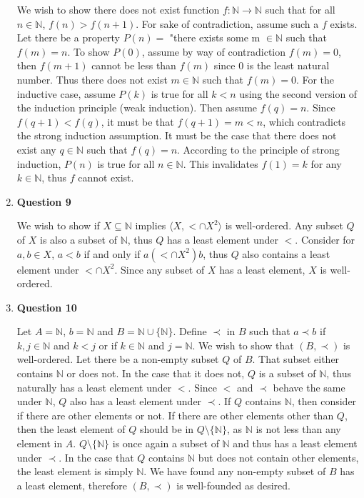 \documentclass{article}
\begin{document}
\begin{enumerate}
	 We wish to show there does not exist function $f: \mathbb{N} \xrightarrow{} \mathbb{N}$ such that for all $n \in \mathbb{N}$, $f(n) > f(n + 1)$. For sake of contradiction, assume such a $f$ exists. Let there be a property $P(n) = $ "there exists some m $\in \mathbb{N}$ such that $f(m) = n$. To show $P(0)$, assume by way of contradiction $f(m) = 0$, then $f(m + 1)$ cannot be less than $f(m)$ since $0$ is the least natural number. Thus there does not exist $m \in \mathbb{N}$ such that $f(m) = 0$. For the inductive case, assume $P(k)$ is true for all $k < n$ using the second version of the induction principle (weak induction). Then assume $f(q) = n$. Since $f(q + 1) < f(q)$, it must be that $f(q + 1) = m < n$, which contradicts the strong induction assumption. It must be the case that there does not exist any $q \in \mathbb{N}$ such that $f(q) = n$. According to the principle of strong induction, $P(n)$ is true for all $n \in \mathbb{N}$. This invalidates $f(1) = k$ for any $k \in \mathbb{N}$, thus $f$ cannot exist. 
	 
	 \item \textbf{Question 9}
	 
	 \medskip
	 
	 We wish to show if $X \subseteq \mathbb{N}$ implies $\langle X, < \cap X^{2} \rangle$ is well-ordered. Any subset $Q$ of $X$ is also a subset of $\mathbb{N}$, thus $Q$ has a least element under $<$. Consider for $a,b \in X$, $a < b$ if and only if $a (< \cap X^{2}) b$, thus $Q$ also contains a least element under $< \cap X^{2}$. Since any subset of $X$ has a least element, $X$ is well-ordered. 
	 
	 
	 \item \textbf{Question 10}
	 
	 \medskip
	 
	 Let $A = \mathbb{N}$, $b = \mathbb{N}$ and $B = \mathbb{N} \cup \{\mathbb{N}\}$. Define $\prec$ in $B$ such that $a \prec b$ if $k,j \in \mathbb{N}$ and $k < j$ or if $k \in \mathbb{N}$ and $j = \mathbb{N}$. We wish to show that $(B, \prec)$ is well-ordered. Let there be a non-empty subset $Q$ of $B$. That subset either contains $\mathbb{N}$ or does not. In the case that it does not, $Q$ is a subset of $\mathbb{N}$, thus naturally has a least element under $<$. Since $<$ and $\prec$ behave the same under $\mathbb{N}$, $Q$ also has a least element under $\prec$. If $Q$ contains $\mathbb{N}$, then consider if there are other elements or not. If there are other elements other than $Q$, then the least element of $Q$ should be in $Q \setminus \{\mathbb{N}\}$, as $\mathbb{N}$ is not less than any element in $A$. $Q \setminus \{\mathbb{N}\}$ is once again a subset of $\mathbb{N}$ and thus has a least element under $\prec$. In the case that $Q$ contains $\mathbb{N}$ but does not contain other elements, the least element is simply $\mathbb{N}$. We have found any non-empty subset of $B$ has a least element, therefore $(B, \prec)$ is well-founded as desired.
	 


\end{enumerate}
\end{document}
